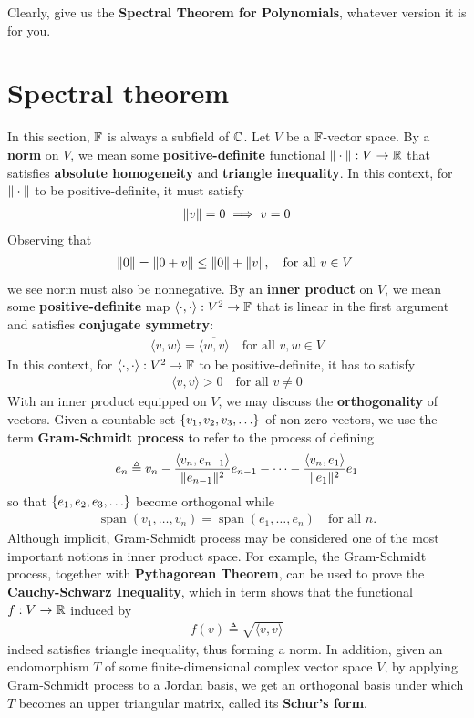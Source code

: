 \documentclass{report}
\begin{document}
Clearly,  give us the \textbf{Spectral Theorem for Polynomials}, whatever version it is for you. 
\section{Spectral theorem}
\label{Spectral Theorem}
In this section, $\mathbb{F}$ is always a subfield of  $\mathbb{C}$. Let  $V$ be a $\mathbb{F}$-vector space. By a \textbf{norm} on $V$, we mean some \textbf{positive-definite} functional $\| \cdot \|:V\to \mathbb{R}$ that satisfies \textbf{absolute homogeneity} and \textbf{triangle inequality}. In this context, for $\| \cdot \|$ to be positive-definite, it must satisfy 
\begin{align*}
  \| v \|=0 \implies  v=0
\end{align*}
Observing that  
\begin{align*}
\| 0 \|=\| 0+v \|\leq \| 0 \|+\| v \|,\quad \text{for all $v\in V$ }
\end{align*}
we see norm must also be nonnegative. By an \textbf{inner product} on $V$, we mean some \textbf{positive-definite}  map $\langle \cdot,\cdot\rangle : V^2 \rightarrow \mathbb{F}$ that is linear in the first argument and satisfies \textbf{conjugate symmetry}: 
\begin{align*}
\langle v,w\rangle = \overline{\langle w,v\rangle }\quad\text{for all }v,w \in V
\end{align*}
In this context, for $\langle \cdot,\cdot\rangle :V^2\rightarrow \mathbb{F}$ to be positive-definite, it has to satisfy 
\begin{align*}
\langle v,v\rangle >0\quad\text{for all }v\neq 0
\end{align*}
With an inner product equipped on $V$, we may discuss the  \textbf{orthogonality} of vectors. Given a countable set  $\set{v_1,v_2,v_3,\dots }$ of non-zero vectors, we use the term \textbf{Gram-Schmidt process} to refer to the process of defining 
\begin{align*}
e_n \triangleq v_n - \frac{\langle v_{n},e_{n-1}\rangle }{\| e_{n-1} \|^2}e_{n-1} - \cdots - \frac{\langle v_n,e_1\rangle }{\| e_1 \|^2}e_1
\end{align*}
so that $\set{e_1,e_2,e_3,\dots}$ become orthogonal while 
\begin{align*}
\operatorname{span}(v_1,\dots ,v_n)=\operatorname{span}(e_1,\dots ,e_n)\quad\text{for all }n.
\end{align*}
Although implicit, Gram-Schmidt process may be considered one of the most important notions in inner product space. For example, the Gram-Schmidt process, together with \textbf{Pythagorean Theorem}, can be used to prove the \textbf{Cauchy-Schwarz Inequality}, which in term shows that the functional $f:V\rightarrow \mathbb{R}$ induced by 
\begin{align*}
f(v)\triangleq \sqrt{\langle v,v\rangle }  
\end{align*}
indeed satisfies triangle inequality, thus forming a norm. In addition, given an endomorphism $T$ of some finite-dimensional complex vector space $V$, by applying Gram-Schmidt process to a Jordan basis, we get an orthogonal basis under which $T$ becomes an upper triangular matrix, called its \textbf{Schur's form}.\\
\end{document}
